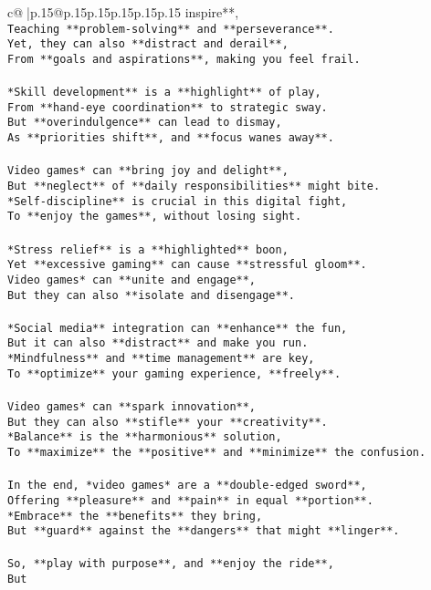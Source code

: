 \documentclass{article}
\begin{document}
{\begin{supertabular}{c@{$\;$}|p{.15\linewidth}@{}p{.15\linewidth}p{.15\linewidth}p{.15\linewidth}p{.15\linewidth}p{.15\linewidth}}
{{{inspire**,  \\ \tt Teaching **problem-solving** and **perseverance**.  \\ \tt Yet, they can also **distract and derail**,  \\ \tt From **goals and aspirations**, making you feel frail.  \\ \tt \\ \tt **Skill development** is a **highlight** of play,  \\ \tt From **hand-eye coordination** to strategic sway.  \\ \tt But **overindulgence** can lead to dismay,  \\ \tt As **priorities shift**, and **focus wanes away**.  \\ \tt \\ \tt *Video games* can **bring joy and delight**,  \\ \tt But **neglect** of **daily responsibilities** might bite.  \\ \tt **Self-discipline** is crucial in this digital fight,  \\ \tt To **enjoy the games**, without losing sight.  \\ \tt \\ \tt **Stress relief** is a **highlighted** boon,  \\ \tt Yet **excessive gaming** can cause **stressful gloom**.  \\ \tt *Video games* can **unite and engage**,  \\ \tt But they can also **isolate and disengage**.  \\ \tt \\ \tt **Social media** integration can **enhance** the fun,  \\ \tt But it can also **distract** and make you run.  \\ \tt **Mindfulness** and **time management** are key,  \\ \tt To **optimize** your gaming experience, **freely**.  \\ \tt \\ \tt *Video games* can **spark innovation**,  \\ \tt But they can also **stifle** your **creativity**.  \\ \tt **Balance** is the **harmonious** solution,  \\ \tt To **maximize** the **positive** and **minimize** the confusion.  \\ \tt \\ \tt In the end, *video games* are a **double-edged sword**,  \\ \tt Offering **pleasure** and **pain** in equal **portion**.  \\ \tt **Embrace** the **benefits** they bring,  \\ \tt But **guard** against the **dangers** that might **linger**.  \\ \tt \\ \tt So, **play with purpose**, and **enjoy the ride**,  \\ \tt But }}}
\end{supertabular}}
\end{document}
